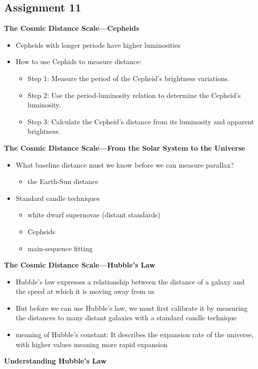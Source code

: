 \subsection{Assignment 11}
\textbf{The Cosmic Distance Scale—Cepheids}
\begin{itemize}
\item Cepheids with longer periods have higher luminosities
\item How to use Cephids to measure distance:
\begin{itemize}
\item Step 1: Measure the period of the Cepheid's brightness variations.
\item Step 2: Use the period-luminosity relation to determine the Cepheid's luminosity.
\item Step 3: Calculate the Cepheid's distance from its luminosity and apparent brightness.
\end{itemize}
\end{itemize}
\textbf{The Cosmic Distance Scale—From the Solar System to the Universe}
\begin{itemize}
\item What baseline distance must we know before we can measure parallax?
\begin{itemize}
\item the Earth-Sun distance
\end{itemize}
\item Standard candle techniques
\begin{itemize}
\item white dwarf supernovae (distant standards)
\item Cepheids
\item main-sequence fitting
\end{itemize}
\end{itemize}
\textbf{The Cosmic Distance Scale—Hubble's Law}
\begin{itemize}
\item Hubble's law expresses a relationship between the distance of a galaxy and the speed at which it is moving away from us
\item But before we can use Hubble's law, we must first calibrate it by measuring the distances to many distant galaxies with a standard candle technique
\item meaning of Hubble's constant: It describes the expansion rate of the universe, with higher values meaning more rapid expansion
\end{itemize}
\textbf{Understanding Hubble’s Law}
